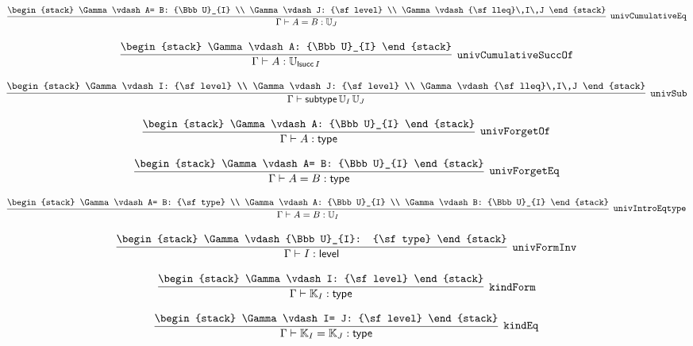 \[
\infer[{\tt univCumulativeEq}]{\Gamma \vdash A= B: {\Bbb U}_{J}}{
\begin{stack}
\Gamma \vdash A= B: {\Bbb U}_{I}
\\
\Gamma \vdash J: {\sf level}
\\
\Gamma \vdash {\sf lleq}\,I\,J
\end{stack}}
\]

\[
\infer[{\tt univCumulativeSuccOf}]{\Gamma \vdash A: {\Bbb U}_{{\sf lsucc}\,I}}{
\begin{stack}
\Gamma \vdash A: {\Bbb U}_{I}
\end{stack}}
\]

\[
\infer[{\tt univSub}]{\Gamma \vdash {\sf subtype}\,{\Bbb U}_{I}\,{\Bbb U}_{J}}{
\begin{stack}
\Gamma \vdash I: {\sf level}
\\
\Gamma \vdash J: {\sf level}
\\
\Gamma \vdash {\sf lleq}\,I\,J
\end{stack}}
\]

\[
\infer[{\tt univForgetOf}]{\Gamma \vdash A: {\sf type}}{
\begin{stack}
\Gamma \vdash A: {\Bbb U}_{I}
\end{stack}}
\]

\[
\infer[{\tt univForgetEq}]{\Gamma \vdash A= B: {\sf type}}{
\begin{stack}
\Gamma \vdash A= B: {\Bbb U}_{I}
\end{stack}}
\]

\[
\infer[{\tt univIntroEqtype}]{\Gamma \vdash A= B: {\Bbb U}_{I}}{
\begin{stack}
\Gamma \vdash A= B: {\sf type}
\\
\Gamma \vdash A: {\Bbb U}_{I}
\\
\Gamma \vdash B: {\Bbb U}_{I}
\end{stack}}
\]

\[
\infer[{\tt univFormInv}]{\Gamma \vdash I: {\sf level}}{
\begin{stack}
\Gamma \vdash {\Bbb U}_{I}: {\sf type}
\end{stack}}
\]

\[
\infer[{\tt kindForm}]{\Gamma \vdash {\Bbb K}_{I}: {\sf type}}{
\begin{stack}
\Gamma \vdash I: {\sf level}
\end{stack}}
\]

\[
\infer[{\tt kindEq}]{\Gamma \vdash {\Bbb K}_{I}= {\Bbb K}_{J}: {\sf type}}{
\begin{stack}
\Gamma \vdash I= J: {\sf level}
\end{stack}}
\]

